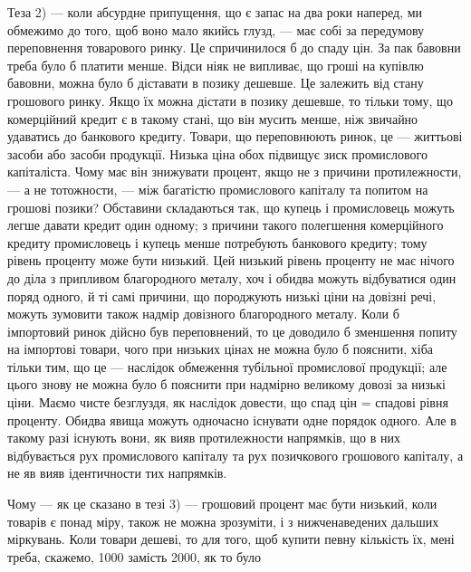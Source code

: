 Теза 2) — коли абсурдне припущення, що є запас на два роки наперед,
ми обмежимо до того, щоб воно мало якийсь глузд, — має собі за передумову
переповнення товарового ринку. Це спричинилося б до спаду цін. За пак бавовни
треба було б платити менше. Відси ніяк не випливає, що гроші на купівлю бавовни,
можна було б діставати в позику дешевше. Це залежить від стану грошового
ринку. Якщо їх можна дістати в позику дешевше, то тільки тому, що комерційний
кредит є в такому стані, що він мусить менше, ніж звичайно удаватись до
банкового кредиту. Товари, що переповнюють ринок, це — життьові засоби або засоби
продукції. Низька ціна обох підвищує зиск промислового капіталіста. Чому
має він знижувати процент, якщо не з причини протилежности, — а не тотожности,
— між багатістю промислового капіталу та попитом на грошові позики?
Обставини складаються так, що купець і промисловець можуть легше давати
кредит один одному; з причини такого полегшення комерційного кредиту промисловець
і купець менше потребують банкового кредиту; тому рівень проценту
може бути низький. Цей низький рівень проценту не має нічого до діла
з припливом благородного металу, хоч і обидва можуть відбуватися один поряд
одного, й ті самі причини, що породжують низькі ціни на довізні речі, можуть
зумовити також надмір довізного благородного металу. Коли б імпортовий ринок
дійсно був переповнений, то це доводило б зменшення попиту на імпортові
товари, чого при низьких цінах не можна було б пояснити, хіба тільки тим,
що це — наслідок обмеження тубільної промислової продукції; але цього знову
не можна було б пояснити при надмірно великому довозі за низькі ціни. Маємо
чисте безглуздя, як наслідок довести, що спад цін = спадові рівня проценту.
Обидва явища можуть одночасно існувати одне порядок одного. Але в такому
разі існують вони, як вияв протилежности напрямків, що в них відбувається рух
промислового капіталу та рух позичкового грошового капіталу, а не яв вияв
ідентичности тих напрямків.

Чому — як це сказано в тезі 3) — грошовий процент має бути низький,
коли товарів є понад міру, також не можна зрозуміти, і з нижченаведених
дальших міркувань. Коли товари дешеві, то для того, щоб купити певну кількість
їх, мені треба, скажемо, 1000 замість 2000, як то було
\parbreak{}  %

